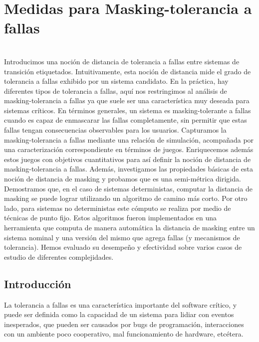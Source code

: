 \chapter{Medidas para Masking-tolerancia a fallas}
\label{cap:maskingMeasure}

 \\
Introducimos una noción de distancia de tolerancia a fallas entre sistemas de transición etiquetados. Intuitivamente, esta noción de distancia mide el grado de tolerancia a fallas exhibido por un sistema candidato.
En la práctica, hay diferentes tipos de tolerancia a fallas, aquí nos restringimos al análisis de masking-tolerancia a fallas ya que suele ser una característica muy deseada para sistemas críticos.
En términos generales, un sistema es masking-tolerante a fallas cuando es capaz de enmascarar las fallas completamente, sin permitir que estas fallas tengan consecuencias observables para los usuarios.
Capturamos la masking-tolerancia a fallas mediante una relación de simulación, acompañada por una caracterización correspondiente en términos de juegos.
Enriquecemos además estos juegos con objetivos cuantitativos para así definir la noción de distancia de masking-tolerancia a fallas.
Además, investigamos las propiedades básicas de esta noción de distancia de masking y probamos que es una semi-métrica dirigida.
Demostramos que, en el caso de sistemas deterministas, computar la distancia de masking se puede lograr utilizando un algoritmo de camino más corto.
Por otro lado, para sistemas no deterministas este cómputo se realiza por medio de técnicas de punto fijo. %
Estos algoritmos fueron implementados en una herramienta que computa de manera automática la distancia de masking entre un sistema nominal y una versión del mismo que agrega fallas (y mecanismos de tolerancia). Hemos evaluado su desempeño y efectividad sobre varios casos de estudio de diferentes complejidades.

\section{Introducción} \label{sec:intro}

La tolerancia a fallas es una característica importante del software crítico, y puede ser definida como la capacidad de un sistema para lidiar con eventos inesperados, que pueden ser causados por bugs de programación, interacciones con un ambiente poco cooperativo, mal funcionamiento de hardware, etcétera.

